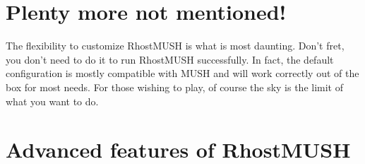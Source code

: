 \documentclass[letterpaper,10pt,english]{sphinxmanual}
\begin{document}
\begin{sphinxVerbatim}[commandchars=\\\{\}]
 \PYG{p}{[}\PYG{p}{]} \PYG{p}{[}

  
 \PYG{p}{[}
\PYG{p}{]} \PYG{p}{[}
\PYG{p}{]}
\end{sphinxVerbatim}


\section{Plenty more not mentioned!}
\label{\detokenize{features:plenty-more-not-mentioned}}
\sphinxAtStartPar
The flexibility to customize RhostMUSH is what is most daunting.
Don’t fret, you don’t need to do it to run RhostMUSH successfully.
In fact, the default configuration is mostly compatible with
MUSH and will work correctly out of the box for most needs.  For those
wishing to play, of course the sky is the limit of what you want to
do.


\section{Advanced features of RhostMUSH}
\label{\detokenize{features:advanced-features-of-rhostmush}}
\end{document}
